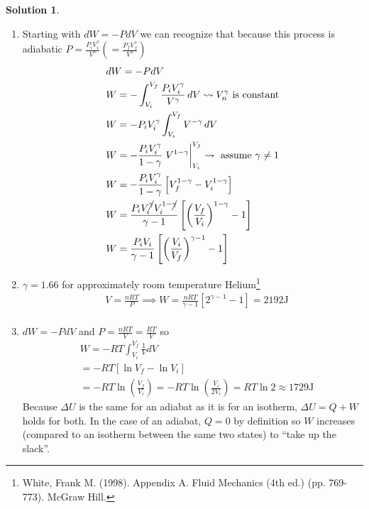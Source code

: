 \documentclass[10pt]{article}
\theoremstyle{definition}
\newtheorem{soln}{Solution}
\begin{document}
\begin{soln}~
  \begin{enumerate}[label=(\alph*)]
    \item Starting with $dW=-PdV$ we can recognize that because this process is adiabatic $\displaystyle P=\frac{P_iV_i^\gamma}{V^\gamma}\left(=\frac{P_fV_f^\gamma}{V^\gamma}\right)$
          \begin{align*}
             & dW=-PdV                                                                                                                    \\
             & W=-\int_{V_i}^{V_f}\frac{P_iV_i^\gamma}{V^\gamma}\,dV\rightsquigarrow V_n^\gamma \text{ is constant}                       \\
             & W=-P_iV_i^\gamma\int_{V_i}^{V_f}V^{-\gamma}\,dV                                                                            \\
             & W=-\frac{P_iV_i^\gamma}{1-\gamma} \eval{V^{1-\gamma}}_{V_i}^{V_f} \rightsquigarrow \text{ assume } \gamma\neq1             \\
             & W=-\frac{P_iV_i^\gamma}{1-\gamma} \left[V_f^{1-\gamma}-V_i^{1-\gamma}\right]                                               \\
             & W=\frac{P_iV_i^{\cancel{\gamma}} V_i^{1-\cancel{\gamma}}}{\gamma-1} \left[\left(\frac{V_f}{V_i}\right)^{1-\gamma}-1\right] \\
             & W=\frac{P_iV_i}{\gamma-1} \left[\left(\frac{V_i}{V_f}\right)^{\gamma-1}-1\right]                                           \\
          \end{align*}
    \item $\gamma=1.66$ for approximately room temperature Helium\footnote{White, Frank M. (1998). Appendix A. Fluid Mechanics (4th ed.) (pp. 769-773). McGraw Hill.}
          \begin{align*}
             & V=\frac{nRT}{P}\implies W=\frac{nRT}{\gamma-1} \left[2^{\gamma-1}-1\right]=2192\unit{\joule} \\
          \end{align*}
    \item $dW=-PdV$ and $\displaystyle P=\frac{nRT}{V}=\frac{RT}{V}$ so
          \begin{align*}
             & W=-RT\int_{V_i}^{V_f}\frac{1}{V}dV                                                                      \\
             & =-RT\left[\ln V_f - \ln V_i\right]                                                                      \\
             & =-RT\ln\left(\frac{V_f}{V_i}\right)=-RT\ln\left(\frac{V_i}{2V_i}\right)=RT\ln 2\approx1729\unit{\joule}
          \end{align*}
          Because $\Delta U$ is the same for an adiabat as it is for an isotherm, $\Delta U = Q+W$ holds for both. In the case of an adiabat, $Q=0$ by definition so $W$ increases 
          (compared to an isotherm between the same two states) to ``take up the slack''. 
  \end{enumerate}
\end{soln}
\end{document}
